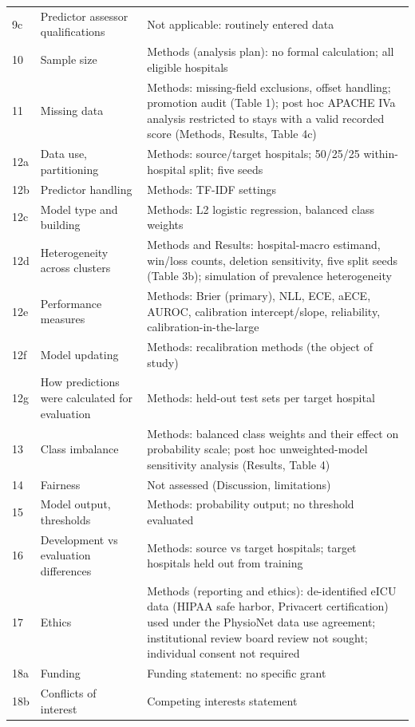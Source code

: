 \documentclass[10pt]{article}
\begin{document}
\begin{longtable}{@{}p{}p{}p{}@{}}
9c & Predictor assessor qualifications & Not applicable: routinely entered data \\
10 & Sample size & Methods (analysis plan): no formal calculation; all eligible hospitals \\
11 & Missing data & Methods: missing-field exclusions, offset handling; promotion audit (Table 1); post hoc APACHE IVa analysis restricted to stays with a valid recorded score (Methods, Results, Table 4c) \\
12a & Data use, partitioning & Methods: source/target hospitals; 50/25/25 within-hospital split; five seeds \\
12b & Predictor handling & Methods: TF-IDF settings \\
12c & Model type and building & Methods: L2 logistic regression, balanced class weights \\
12d & Heterogeneity across clusters & Methods and Results: hospital-macro estimand, win/loss counts, deletion sensitivity, five split seeds (Table 3b); simulation of prevalence heterogeneity \\
12e & Performance measures & Methods: Brier (primary), NLL, ECE, aECE, AUROC, calibration intercept/slope, reliability, calibration-in-the-large \\
12f & Model updating & Methods: recalibration methods (the object of study) \\
12g & How predictions were calculated for evaluation & Methods: held-out test sets per target hospital \\
13 & Class imbalance & Methods: balanced class weights and their effect on probability scale; post hoc unweighted-model sensitivity analysis (Results, Table 4) \\
14 & Fairness & Not assessed (Discussion, limitations) \\
15 & Model output, thresholds & Methods: probability output; no threshold evaluated \\
16 & Development vs evaluation differences & Methods: source vs target hospitals; target hospitals held out from training \\
17 & Ethics & Methods (reporting and ethics): de-identified eICU data (HIPAA safe harbor, Privacert certification) used under the PhysioNet data use agreement; institutional review board review not sought; individual consent not required \\
18a & Funding & Funding statement: no specific grant \\
18b & Conflicts of interest & Competing interests statement \\

\end{longtable}
\end{document}

